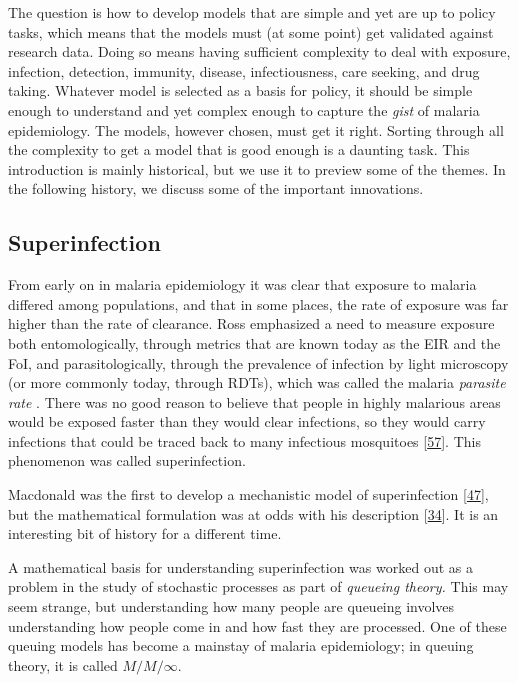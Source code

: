 \documentclass[
]{book}
\begin{document}
The question is how to develop models that are simple and yet are up to policy tasks, which means that the models must (at some point) get validated against research data. Doing so means having sufficient complexity to deal with exposure, infection, detection, immunity, disease, infectiousness, care seeking, and drug taking. Whatever model is selected as a basis for policy, it should be simple enough to understand and yet complex enough to capture the \emph{gist} of malaria epidemiology. The models, however chosen, must get it right. Sorting through all the complexity to get a model that is good enough is a daunting task. This introduction is mainly historical, but we use it to preview some of the themes. In the following history, we discuss some of the important innovations.

\hypertarget{superinfection}{%
\subsection{Superinfection}\label{superinfection}}

From early on in malaria epidemiology it was clear that exposure to malaria differed among populations, and that in some places, the rate of exposure was far higher than the rate of clearance. Ross emphasized a need to measure exposure both entomologically, through metrics that are known today as the EIR and the FoI, and parasitologically, through the prevalence of infection by light microscopy (or more commonly today, through RDTs), which was called the malaria \emph{parasite rate} . There was no good reason to believe that people in highly malarious areas would be exposed faster than they would clear infections, so they would carry infections that could be traced back to many infectious mosquitoes {[}\protect\hyperlink{ref-WaltonGA1947ControlMalaria}{57}{]}. This phenomenon was called superinfection.

Macdonald was the first to develop a mechanistic model of superinfection {[}\protect\hyperlink{ref-MacdonaldG1950Superinfection}{47}{]}, but the mathematical formulation was at odds with his description {[}\protect\hyperlink{ref-FinePEM1975SuperinfectionProblem}{34}{]}. It is an interesting bit of history for a different time.

A mathematical basis for understanding superinfection was worked out as a problem in the study of stochastic processes as part of \emph{queueing theory.} This may seem strange, but understanding how many people are queueing involves understanding how people come in and how fast they are processed. One of these queuing models has become a mainstay of malaria epidemiology; in queuing theory, it is called \(M/M/\infty\).
\end{document}
